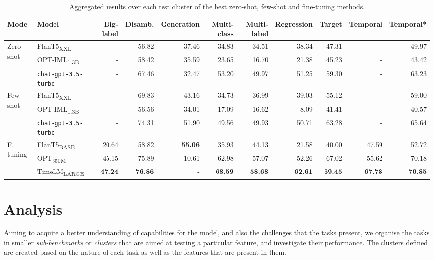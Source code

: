 \begin{table}[t]
\begin{adjustbox}{width=\textwidth,center}
\begin{tabular}{@{}llrrrrrrrrr@{}} \toprule
Mode & Model  & Big-label & Disamb. & Generation & Multi-class & Multi-label & Regression & Target & Temporal & Temporal* \\ \midrule
\multirow[t]{2}{*}{Zero-shot} & FlanT5\textsubscript{XXL} & - & 56.82 & 37.46 & 34.83 & 34.51 & 38.34 & 47.31 & - & 49.97 \\
 & OPT-IML\textsubscript{1.3B} & - & 58.42 & 35.59 & 23.65 & 16.70 & 21.38 & 45.23 & - & 43.42 \\
& \texttt{chat-gpt-3.5-turbo} & - & 67.46 & 32.47 & 53.20 &  49.97 & 51.25 & 59.30 & - & 63.23 \\
\midrule
\multirow[t]{2}{*}{Few-shot} & FlanT5\textsubscript{XXL} & - & 69.83 & 43.16 & 34.73 & 36.99 & 39.03 & 55.12 & - & 59.00 \\
 & OPT-IML\textsubscript{1.3B} & - & 56.56 & 34.01 & 17.09 & 16.62 & 8.09 & 41.41 & - & 40.57 \\
 & \texttt{chat-gpt-3.5-turbo} & - & 74.31 & 51.90 & 49.56 & 49.93 & 50.71 & 63.28 & - & 65.64 \\
\midrule
\multirow[t]{3}{*}{F. tuning} & FlanT5\textsubscript{BASE} & 20.64 & 58.82 & \textbf{55.06} & 35.93 & 44.13 & 21.58 & 40.00 & 47.59 & 52.72 \\
 & OPT\textsubscript{350M} & 45.15 & 75.89 & 10.61 & 62.98 & 57.07 & 52.26 & 67.02 & 55.62 & 70.18 \\
 & TimeLM\textsubscript{LARGE} & \textbf{47.24} & \textbf{76.86} & - & \textbf{68.59} & \textbf{58.68} & \textbf{62.61} & \textbf{69.45} & \textbf{67.78} & \textbf{70.85} \\
\bottomrule
\end{tabular}
\end{adjustbox}
\caption{Aggregated results over each test cluster of the best zero-shot, few-shot and fine-tuning methods.}
\label{tab:results_of_groups}
\end{table}


\section{Analysis}
Aiming to acquire a better understanding of capabilities for the model, and also the challenges that the tasks present, we organise the tasks in smaller \textit{sub-benchmarks} or \textit{clusters} that are aimed at testing a particular feature, and investigate their performance. The clusters defined are created based on the nature of each task as well as the features that are present in them.

